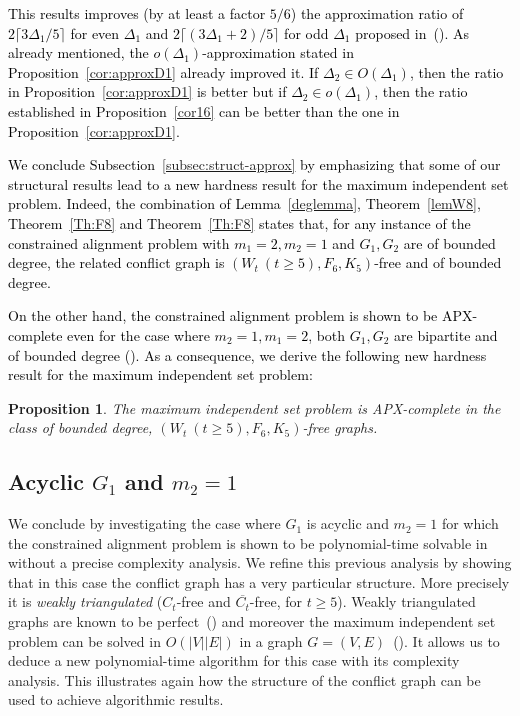 \documentclass[final]{dmtcs-episciences}
\newtheorem{proposition}[theorem]{Proposition}
\newcommand\mar[1]{\textcolor{black}{#1}}
\begin{document}
\mar{This results improves (by at least a factor $5/6$) the approximation ratio of $2\lceil3\Delta_1/5\rceil$
for even $\Delta_1$ and $2\lceil(3\Delta_1+2)/5\rceil$ for odd 
$\Delta_1$ proposed in~(\citet{Fertin200990}). As already mentioned, the $o(\Delta_1)$-approximation stated in Proposition~\ref{cor:approxD1} already improved it. If $\Delta_2\in O(\Delta_1)$, then the ratio in Proposition~\ref{cor:approxD1} is better but if $\Delta_2\in o(\Delta_1)$, then the ratio established in  Proposition~\ref{cor16} can be better than the one in Proposition~\ref{cor:approxD1}.}

\mar{We conclude Subsection~\ref{subsec:struct-approx} by emphasizing that some of our structural results lead to a new hardness result for the maximum independent set problem.  Indeed, the combination of Lemma~\ref{deglemma}, Theorem~\ref{lemW8}, Theorem~\ref{Th:F8} and Theorem~\ref{Th:F8} states that, for any instance of the constrained alignment problem with $m_1=2, m_2=1$ and $G_1,G_2$ are of bounded degree, the related conflict graph is 
$\left(W_t\ (t\geq 5),F_6,K_5\right)$-free and of bounded degree.}

\mar{On the other hand,  the constrained alignment problem is shown to be APX-complete  even for the case where
$m_2=1, m_1=2$, both $G_1, G_2$ are bipartite and of  bounded degree (\citet{Fertin200990}).  As a consequence, we derive the following new hardness result for the maximum independent set problem:}

\begin{proposition}
The maximum independent set problem is APX-complete in the class of bounded degree, $\left(W_t\ (t\geq 5),F_6,K_5\right)$-free graphs. 
\end{proposition}



\subsection{Acyclic $G_1$ and $m_2=1$}\label{subsec:acyclic}

We conclude by investigating the case where  $G_1$ is acyclic and  $m_2=1$ for which the constrained alignment
problem is shown to be polynomial-time solvable in~\citet{AbakaBE13} without a precise complexity analysis. We refine this previous analysis by showing that in this case the conflict graph has a very particular structure. More precisely it is {\em weakly triangulated} ($C_t$-free and $\overline{C_t}$-free, for $t\geq 5$). Weakly triangulated graphs are known to be perfect~(\citet{hayward}) and moreover the maximum independent set problem can be solved in $O(|V||E|)$ in a graph $G=(V,E)$~(\citet{hayward2}). It allows us to deduce a new polynomial-time algorithm for this case with its complexity analysis. This illustrates again how the structure of the conflict graph can be used to achieve algorithmic results. 
\end{document}
